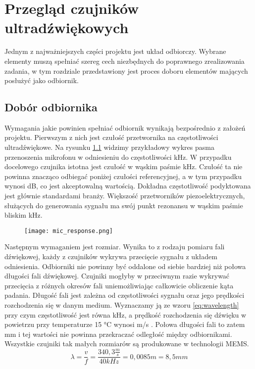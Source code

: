 \chapter[Przegląd czujników ultradźwiękowych]{Przegląd czujników ultradźwiękowych}

\label{chapter:przeglad_czujnikow}
Jednym z najważniejszych części projektu jest układ odbiorczy. 
Wybrane elementy muszą spełniać szereg cech niezbędnych do poprawnego zrealizowania zadania, 
w tym rozdziale przedstawiony jest proces doboru elementów mających posłużyć jako odbiornik.




\section{Dobór odbiornika}
Wymagania jakie powinien spełniać odbiornik wynikają bezpośrednio z założeń projektu. 
Pierwszym z nich jest czułość przetwornika na częstotliwości ultradźwiękowe. Na rysunku \ref{fig:mic_response} 
widzimy przykładowy wykres pasma przenoszenia mikrofonu w odniesieniu do częstotliwości \unit[1]{kHz}. 
W przypadku docelowego czujnika istotna jest czułość w wąskim paśmie \unit[40]{kHz}. 
Czułość ta nie powinna znacząco odbiegać poniżej czułości referencyjnej, a w tym przypadku wynosi \unit[-2]{dB}, co jest akceptowalną wartością.
Dokładna częstotliwość podyktowana jest głównie standardami branży. Większość przetworników piezoelektrycznych, 
służących do generowania sygnału ma swój punkt rezonansu w wąskim paśmie bliskim \unit[40]{kHz}.

\begin{figure}[ht!]
    \centering
    \texttt{[image: mic\_response.png]}
    \label{fig:mic_response}
\end{figure}

\noindent

Następnym wymaganiem jest rozmiar. 
Wynika to z rodzaju pomiaru fali dźwiękowej, każdy z czujników wykrywa przecięcie sygnału z układem odniesienia. 
Odbiorniki nie powinny być oddalone od siebie bardziej niż połowa długości fali dźwiękowej. 
Czujniki mogłyby w przeciwnym razie wykrywać przecięcia z różnych okresów fali uniemożliwiając całkowicie obliczenie kąta padania. 
Długość fali jest zależna od częstotliwości sygnału oraz jego prędkości rozchodzenia się w danym medium. 
Wyznaczamy ją ze wzoru \ref{eq:wavelength} przy czym częstotliwość jest równa \unit[40]{kHz},
a prędkość rozchodzenia się dźwięku w powietrzu przy temperaturze 15 °C wynosi \unit[340,3]{m/s} \cite{sound_speed}.
Połowa długości fali to zatem \unit[4,25]{mm} i tej wartości nie powinna przekraczać odległość między odbiornikami.
Wszystkie czujniki tak małych rozmiarów są produkowane w technologii MEMS. 
\begin{equation}
\lambda = \frac{v}{f} = \frac{340,3\frac{m}{s}}{40kHz}=0,0085m = 8,5mm
\label{eq:wavelength}    
\end{equation}

